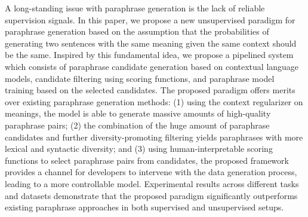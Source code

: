 A long-standing issue with paraphrase generation is the lack of reliable supervision signals. In this paper, we propose a new unsupervised paradigm for paraphrase generation based on the assumption that the probabilities of generating two sentences with the same meaning given the same context should be the same. Inspired by this fundamental idea, we propose a pipelined system which consists of paraphrase candidate generation based on contextual language models, candidate filtering using scoring functions, and paraphrase model training based on  the selected candidates. The proposed paradigm offers merits over existing paraphrase generation methods: (1) using the context regularizer on meanings, the model is able to generate massive amounts of high-quality paraphrase pairs; (2) the combination of the huge amount of paraphrase candidates and further diversity-promoting filtering yields paraphrases with more lexical and syntactic diversity; and (3) using human-interpretable scoring functions to select paraphrase pairs from candidates, the proposed framework provides a channel for developers to intervene with the data generation process, leading to a more controllable model. Experimental results across different tasks and datasets demonstrate that the proposed paradigm significantly outperforms existing paraphrase approaches in both supervised and unsupervised setups.
